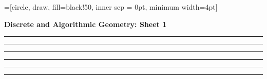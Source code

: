 \documentclass[a4paper, 10pt]{article}
\theoremstyle{definition} %
\begin{document}
\onehalfspacing
{}=[circle, draw, fill=black!50, inner sep = 0pt, minimum width=4pt]

\textbf{\Large Discrete and Algorithmic Geometry: Sheet 1}

\vspace{20pt}



\vspace{5pt}

\begin{center}
    \rule{5cm}{0.4pt}
\end{center}

\newpage



\vspace{5pt}

\begin{center}
    \rule{5cm}{0.4pt}
\end{center}

\newpage



\vspace{5pt}

\begin{center}
    \rule{5cm}{0.4pt}
\end{center}

\newpage



\vspace{5pt}

\begin{center}
    \rule{5cm}{0.4pt}
\end{center}

\newpage



\vspace{5pt}

\begin{center}
    \rule{5cm}{0.4pt}
\end{center}

\newpage



\vspace{5pt}

\begin{center}
    \rule{5cm}{0.4pt}
\end{center}
\end{document}
